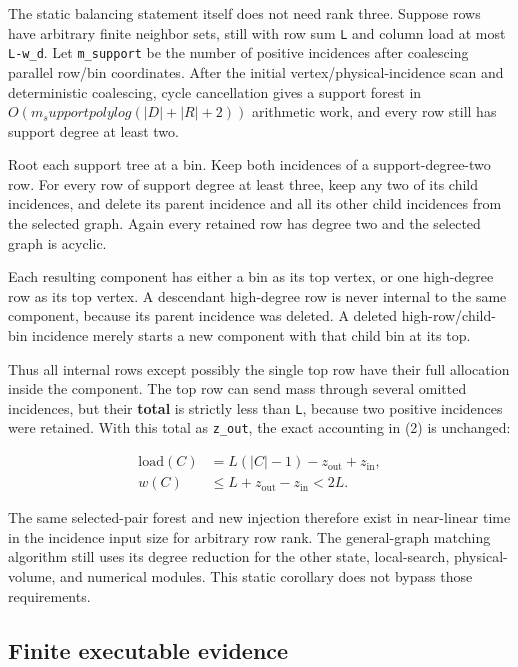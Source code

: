 The static balancing statement itself does not need rank three. Suppose rows have arbitrary finite neighbor sets, still with row sum \texttt{L} and column load at most \texttt{L-w\_d}. Let \texttt{m\_support} be the number of positive incidences after coalescing parallel row/bin coordinates. After the initial vertex/physical-incidence scan and deterministic coalescing, cycle cancellation gives a support forest in \(O(m_support polylog(|D|+|R|+2))\) arithmetic work, and every row still has support degree at least two.

Root each support tree at a bin. Keep both incidences of a support-degree-two row. For every row of support degree at least three, keep any two of its child incidences, and delete its parent incidence and all its other child incidences from the selected graph. Again every retained row has degree two and the selected graph is acyclic.

Each resulting component has either a bin as its top vertex, or one high-degree row as its top vertex. A descendant high-degree row is never internal to the same component, because its parent incidence was deleted. A deleted high-row/child-bin incidence merely starts a new component with that child bin at its top.

Thus all internal rows except possibly the single top row have their full allocation inside the component. The top row can send mass through several omitted incidences, but their \textbf{total} is strictly less than \texttt{L}, because two positive incidences were retained. With this total as \texttt{z\_out}, the exact accounting in (2) is unchanged:

\[
\begin{aligned}\mathrm{load}(C)&=L(|C|-1)-z_{\mathrm{out}}+z_{\mathrm{in}},\\ w(C)&\le L+z_{\mathrm{out}}-z_{\mathrm{in}}<2L.\end{aligned}
\]

The same selected-pair forest and new injection therefore exist in near-linear time in the incidence input size for arbitrary row rank. The general-graph matching algorithm still uses its degree reduction for the other state, local-search, physical-volume, and numerical modules. This static corollary does not bypass those requirements.

\hypertarget{af-c467a6f0ad-finite-executable-evidence}{%
\subsection{Finite executable evidence}\label{af-c467a6f0ad-finite-executable-evidence}}

